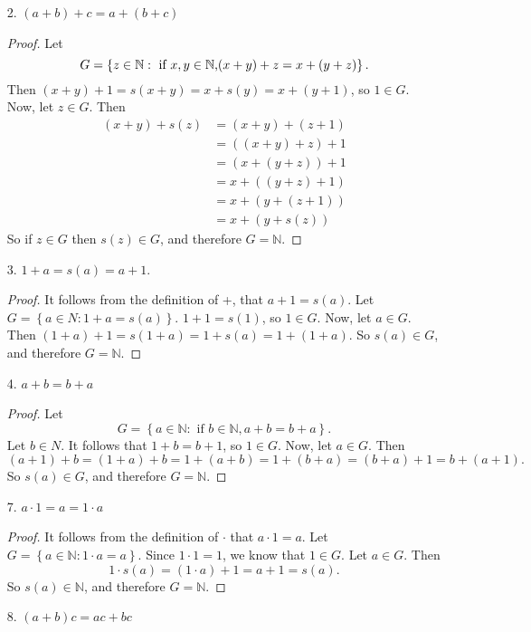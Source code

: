 \documentclass{article}
\newcommand{\N}{\mathbb{N}}
\begin{document}
\begin{enumerate}
	\item[2.] $(a + b) + c = a + (b + c)$
	\begin{proof}
		Let \[G = \left\{z\in \N: \text{ if } x,y \in \N \text, (x + y) + z = x + (y + z)\right\}.\]
		Then $(x + y) + 1 = s(x + y) = x + s(y) = x + (y + 1)$, so $1 \in G$.
		Now, let $z \in G$. Then 
		\begin{align*}
			(x + y) + s(z) &= (x + y) + (z + 1) \\&= ((x + y) + z) + 1 \\&= (x + (y + z)) + 1 \\&= x + ((y + z) + 1) \\&= x + (y + (z + 1)) \\&= x + (y + s(z))
		\end{align*}
		So if $z \in G$ then $s(z) \in G$, and therefore $G = \N$.
	\end{proof}
	\item[3.] $1 + a = s(a) = a + 1$.
	\begin{proof}
		It follows from the definition of +, that $a + 1 = s(a)$. Let $G = \left\{a \in N: 1 + a = s(a)\right\}$. $1 + 1 = s(1)$, so $1 \in G$. Now, let $a \in G$. Then $(1 + a) + 1 = s(1 + a) = 1 + s(a) = 1 + (1 + a)$. So $s(a) \in G$, and therefore $G = \N$.
	\end{proof}
	\item[4.] $a + b = b + a$
	\begin{proof}
		Let \[G = \left\{a \in \N: \text{ if } b \in \N, a + b = b + a \right\}.\]
		Let $b \in N$. It follows that $1 + b = b + 1$, so $1 \in G$. Now, let $a \in G$. Then \[(a + 1) + b = (1 + a) + b = 1 + (a + b) = 1 + (b + a) = (b + a) + 1 = b + (a + 1).\] So $s(a) \in G$, and therefore $G = \N$.
	\end{proof}
	\item[7.] $a \cdot 1 = a = 1 \cdot a$
	\begin{proof}
		It follows from the definition of $\cdot$ that $a \cdot 1 = a$. Let $G = \left\{a \in \N: 1 \cdot a = a\right\}$. Since $1 \cdot 1 = 1$, we know that $1 \in G$. Let $a \in G$. Then \[1 \cdot s(a) = (1 \cdot a) + 1 = a + 1 = s(a).\] So $s(a) \in \N$, and therefore $G = \N$.
	\end{proof}
	\item[8.] $(a + b)c = ac + bc$
\end{enumerate}
\end{document}
